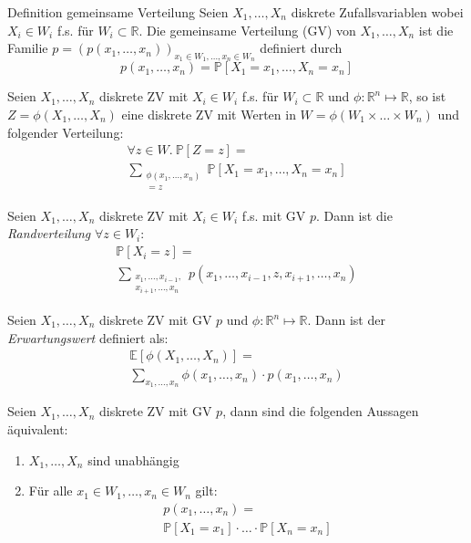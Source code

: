\documentclass[a4paper,10pt]{article}
\def\R{\mathbb{R}}
\def\P{\mathbb{P}}
\def\E{\mathbb{E}}
\begin{document}
\begin{subbox}{Definition gemeinsame Verteilung}
	Seien \(X_1, \ldots, X_n\) diskrete Zufallsvariablen wobei \(X_i \in W_i\) f.s. für \(W_i \subset \R\). Die gemeinsame Verteilung (GV) von \(X_1, \ldots, X_n\) ist die Familie \(p = (p(x_1, \ldots, x_n))_{x_1 \in W_1, \ldots, x_n \in W_n}\) definiert durch
	\[p(x_1, \ldots, x_n) = \P[X_1 = x_1, \ldots, X_n = x_n]\]
\end{subbox}

Seien \(X_1,\ldots,X_n\) diskrete ZV mit \(X_i \in W_i\) f.s. für \(W_i \subset \R\) und \(\phi: \R^n \mapsto \R\), so ist \(Z = \phi(X_1, \ldots, X_n)\) eine diskrete ZV mit Werten in \(W = \phi(W_1 \times \ldots \times W_n)\) und folgender Verteilung:
\begin{multline*}
    \forall z \in W. \: \P[Z = z] = \\
    \sum_{\substack{\phi(x_1, \ldots, x_n) \\= z}} \P[X_1 = x_1, \ldots, X_n = x_n]
\end{multline*}

Seien \(X_1,\ldots,X_n\) diskrete ZV mit \(X_i \in W_i\) f.s. mit GV \(p\). Dann ist die \emph{Randverteilung} \(\forall z \in W_i\):
\begin{multline*}
    \P[X_i = z] = \\
    \sum_{\substack{x_1, \ldots, x_{i-1}, \\x_{i+1},\ldots,x_n}} p(x_1, \ldots, x_{i-1}, z, x_{i+1},\ldots,x_n)
\end{multline*}

Seien \(X_1,\ldots,X_n\) diskrete ZV mit GV \(p\) und \(\phi : \R^n \mapsto \R\). Dann ist der \emph{Erwartungswert} definiert als:
\begin{multline*}
    \E[\phi(X_1, \ldots, X_n)] = \\
    \sum_{x_1,\ldots,x_n} \phi(x_1,\ldots,x_n) \cdot p(x_1,\ldots,x_n)
\end{multline*}

Seien \(X_1,\ldots,X_n\) diskrete ZV mit GV \(p\), dann sind die folgenden Aussagen äquivalent:
\begin{enumerate}
	\item \(X_1,\ldots,X_n\) sind unabhängig
	\item Für alle \(x_1 \in W_1, \ldots, x_n \in W_n\) gilt:
	      \begin{multline*}
              p(x_1,\ldots,x_n) = \\
              \P[X_1 = x_1] \cdot \ldots \cdot \P[X_n = x_n]
          \end{multline*}
\end{enumerate}
\end{document}
